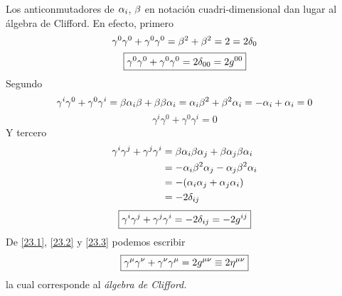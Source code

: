 \begin{obs}
	Los anticonmutadores de $\alpha_i$, $\beta$ en notación cuadri-dimensional dan lugar al álgebra de Clifford. En efecto, primero
	\begin{equation}
  \gamma^0\gamma^0+\gamma^0\gamma^0 =\beta^2+\beta^2=2=2\delta_{0}
\end{equation}
\begin{equation}\label{23.1}
\boxed{   \gamma^0\gamma^0+\gamma^0\gamma^0=2\delta_{00}=2g^{00}}
\end{equation}
Segundo
\begin{equation}
  \gamma^{i}\gamma^0+\gamma^0\gamma^{i} =\beta\alpha_i\beta +\beta \beta \alpha_i=\alpha_i\beta^2+\beta^2\alpha_i=-\alpha_i+\alpha_i=0
\end{equation}
\begin{equation}\label{23.2}
\boxed{  \gamma^{i}\gamma^0+\gamma^0\gamma^{i}=0}
\end{equation}
Y tercero
\begin{align}
  \gamma^{i}\gamma^j+\gamma^j\gamma^{i}&=\beta\alpha_i\beta\alpha_j+\beta\alpha_j\beta\alpha_i\\
  &=-\alpha_i\beta^2\alpha_j-\alpha_j\beta^2\alpha_i\\
  &=-(\alpha_i\alpha_j+\alpha_j\alpha_i)\\
  &=-2\delta_{ij}
\end{align}
\begin{equation}\label{23.3}
\boxed{  \gamma^{i}\gamma^j+\gamma^j\gamma^{i}=-2\delta_{ij}=-2g^{ij}}
\end{equation}
De \eqref{23.1}, \eqref{23.2} y \eqref{23.3} podemos escribir
\begin{equation}
\boxed{  \gamma^\mu \gamma^\nu +\gamma^\nu \gamma^\mu =2g^{\mu\nu }\equiv 2\eta^{\mu\nu }}
\end{equation}
la cual corresponde al \textit{álgebra de Clifford.}
\end{obs}

